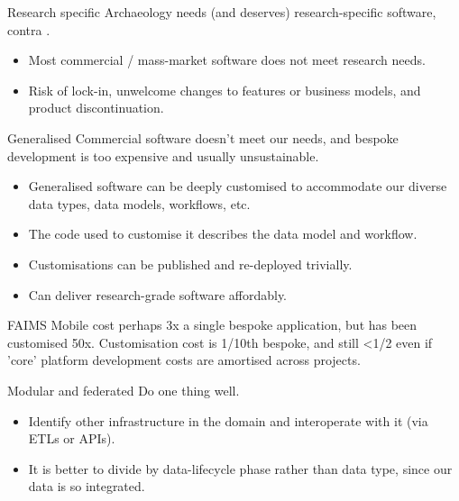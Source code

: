 \documentclass[aspectratio=169, 12pt]{beamer} %
\begin{document}
\begin{frame}{Research specific}
    Archaeology needs (and deserves) research-specific software, contra \cite{Roosevelt2015-kd}.
      \begin{itemize}
        \item Most commercial / mass-market software does not meet research needs.
        \item Risk of lock-in, unwelcome changes to features or business models, and product discontinuation.
    \end{itemize}
\end{frame}

\begin{frame}{Generalised}
   Commercial software doesn't meet our needs, and bespoke development is too expensive and usually unsustainable.
      \begin{itemize}
        \item Generalised software can be deeply customised to accommodate our diverse data types, data models, workflows, etc.
        \item The code used to customise it describes the data model and workflow.
        \item Customisations can be published and re-deployed trivially.
        \item Can deliver research-grade software affordably.  
    \end{itemize}
    FAIMS Mobile cost perhaps 3x a single bespoke application, but has been customised 50x. Customisation cost is 1/10th bespoke, and still <1/2 even if 'core' platform development costs are amortised across projects.
\end{frame}

\begin{frame}{Modular and federated}
   Do one thing well.
      \begin{itemize}
        \item Identify other infrastructure in the domain and interoperate with it (via ETLs or APIs).
        \item It is better to divide by data-lifecycle phase rather than data type, since our data is so integrated.
    \end{itemize}
\end{frame}
\end{document}
